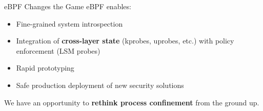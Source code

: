 \documentclass[12pt, dvipsnames, aspectratio=169]{beamer}
\begin{document}
%
%

\begin{frame}[c]{eBPF Changes the Game}
eBPF enables:
\begin{itemize}
    \item Fine-grained system introspection
    \item Integration of \textbf{cross-layer state} (kprobes, uprobes, etc.) with policy enforcement (LSM probes)
    \item Rapid prototyping
    \item Safe production deployment of new security solutions
\end{itemize}
\vfill
We have an opportunity to \textbf{rethink process confinement} from the ground up.
\end{frame}


\end{document}
